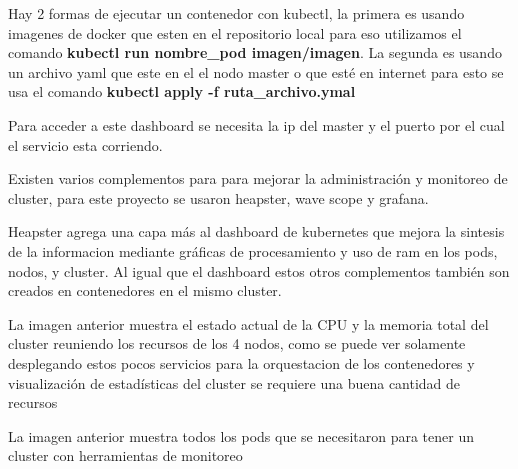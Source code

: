      Hay 2 formas de ejecutar un contenedor con kubectl, la primera es usando imagenes de docker que esten en el repositorio local para eso utilizamos el comando \textbf{kubectl run nombre\_pod imagen/imagen}. La segunda es usando un archivo yaml que este en el el nodo master o que esté en internet para esto se usa el comando \textbf{kubectl apply -f ruta\_archivo.ymal}
     
     
     
     Para acceder a este dashboard se necesita la ip del master y el puerto por el cual el servicio esta corriendo.
     
     
     Existen varios complementos para para mejorar la administración y monitoreo de cluster, para este proyecto se usaron heapster, wave scope y grafana.
     
     Heapster agrega una capa más al dashboard de kubernetes que mejora la sintesis de la informacion mediante gráficas de procesamiento y uso de ram en los pods, nodos, y cluster.
     Al igual que el dashboard estos otros complementos también son creados en contenedores en el mismo cluster.
     
     
     
      
      La imagen anterior muestra el estado actual de la CPU y la memoria total del cluster reuniendo los recursos de los 4 nodos, como se puede ver solamente desplegando estos pocos servicios para la orquestacion de los contenedores y visualización de estadísticas del cluster se requiere una buena cantidad de recursos
      
      
      
      
     La imagen anterior muestra todos los pods que se necesitaron para tener un cluster con herramientas de monitoreo 
     
      
      
      
      
      
      
